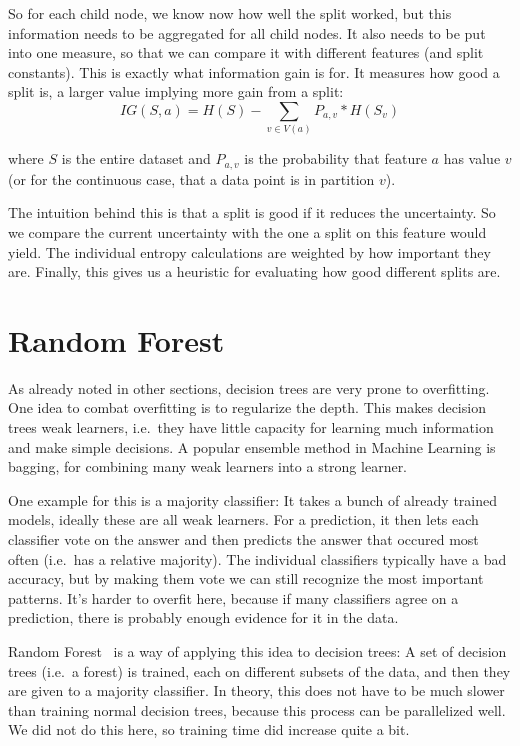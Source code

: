 \documentclass[a4paper]{article}
\begin{document}
So for each child node, we know now how well the split worked, but this information needs to be aggregated for all child nodes. It also needs to be put into one measure, so that we can compare it with different features (and split constants). This is exactly what information gain is for. It measures how good a split is, a larger value implying more gain from a split:
\[
	\mathit{IG}(S, a) = H(S) - \sum\limits_{v \in V(a)} P_{a, v} * H(S_v)
\]

\noindent where $S$ is the entire dataset and $P_{a, v}$ is the probability that feature $a$ has value $v$ (or for the continuous case, that a data point is in partition $v$).

The intuition behind this is that a split is good if it reduces the uncertainty. So we compare the current uncertainty with the one a split on this feature would yield. The individual entropy calculations are weighted by how important they are. Finally, this gives us a heuristic for evaluating how good different splits are.

\section{Random Forest}

As already noted in other sections, decision trees are very prone to overfitting. One idea to combat overfitting is to regularize the depth. This makes decision trees weak learners, i.e.\ they have little capacity for learning much information and make simple decisions. A popular ensemble method in Machine Learning is bagging, for combining many weak learners into a strong learner.

One example for this is a majority classifier: It takes a bunch of already trained models, ideally these are all weak learners. For a prediction, it then lets each classifier vote on the answer and then predicts the answer that occured most often (i.e.\ has a relative majority). The individual classifiers typically have a bad accuracy, but by making them vote we can still recognize the most important patterns. It's harder to overfit here, because if many classifiers agree on a prediction, there is probably enough evidence for it in the data.

Random Forest~\cite{friedman2001elements} is a way of applying this idea to decision trees: A set of decision trees (i.e.\ a forest) is trained, each on different subsets of the data, and then they are given to a majority classifier. In theory, this does not have to be much slower than training normal decision trees, because this process can be parallelized well. We did not do this here, so training time did increase quite a bit.
\end{document}
